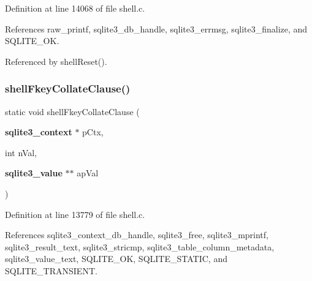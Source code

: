 Definition at line 14068 of file shell.\+c.



References raw\+\_\+printf, sqlite3\+\_\+db\+\_\+handle, sqlite3\+\_\+errmsg, sqlite3\+\_\+finalize, and S\+Q\+L\+I\+T\+E\+\_\+\+OK.



Referenced by shell\+Reset().


\mbox{\label{shell_8c_ab58b75d6f4760b9352046b71749bcbc4}} 
\subsubsection{shell\+Fkey\+Collate\+Clause()}
{\footnotesize\ttfamily static void shell\+Fkey\+Collate\+Clause (\begin{DoxyParamCaption}\item[{\textbf{ sqlite3\+\_\+context} $\ast$}]{p\+Ctx,  }\item[{int}]{n\+Val,  }\item[{\textbf{ sqlite3\+\_\+value} $\ast$$\ast$}]{ap\+Val }\end{DoxyParamCaption})\hspace{0.3cm}{\ttfamily [static]}}



Definition at line 13779 of file shell.\+c.



References sqlite3\+\_\+context\+\_\+db\+\_\+handle, sqlite3\+\_\+free, sqlite3\+\_\+mprintf, sqlite3\+\_\+result\+\_\+text, sqlite3\+\_\+stricmp, sqlite3\+\_\+table\+\_\+column\+\_\+metadata, sqlite3\+\_\+value\+\_\+text, S\+Q\+L\+I\+T\+E\+\_\+\+OK, S\+Q\+L\+I\+T\+E\+\_\+\+S\+T\+A\+T\+IC, and S\+Q\+L\+I\+T\+E\+\_\+\+T\+R\+A\+N\+S\+I\+E\+NT.



